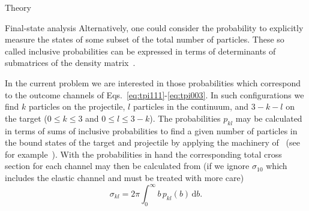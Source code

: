 \documentclass[aps, pra, reprint, groupedaddress, amsfonts, longbibliography,
               amsmath, amssymb, showpacs, nofootinbib]{revtex4-1}
\begin{document}
\begin{section}{Theory \label{sec:theory}}
\begin{subsection}{Final-state analysis \label{sec:probs}}
      Alternatively, one could consider the probability to explicitly measure the states of some subset
      of the total number of particles. These so called inclusive probabilities can be expressed in
      terms of determinants of submatrices of the density matrix~\cite{inc-prob}.

      In the current problem we are interested in those probabilities which correspond to the outcome
      channels of Eqs.~\eqref{eq:tpi111}-\eqref{eq:tpi003}. In such configurations we find $k$ particles
      on the projectile, $l$ particles in the continuum, and $3 - k - l$ on the target ($0\leq k \leq 3$
      and $0 \leq l \leq 3 - k$). The probabilities $p_{kl}$ may be calculated in terms of sums of
      inclusive probabilities to find a given number of particles in the bound states of the target and
      projectile by applying the machinery of~\cite{inc-prob} (see for example~\cite{incEx, mitsuko12,
      gerald15}). With the probabilities in hand the corresponding total cross section for each channel
      may then be calculated from (if we ignore $\sigma_{10}$ which includes the elastic channel and
      must be treated with more care)
      \begin{equation} \label{eq:cross}
         \sigma_{kl} = 2 \pi \int_0^\infty b \, p_{kl}(b) \, \mathrm{d}b.
      \end{equation}

   \end{subsection}

\end{section}
\end{document}
